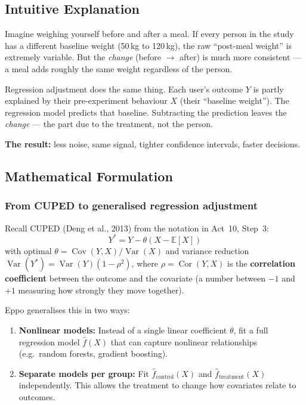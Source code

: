 \documentclass[12pt, a4paper]{article}
\newcommand{\E}{\mathbb{E}}            %
\newcommand{\Var}{\operatorname{Var}}
\newcommand{\Cov}{\operatorname{Cov}}
\newcommand{\Cor}{\operatorname{Cor}}
\begin{document}
\subsection{Intuitive Explanation}

\begin{intuition}
Imagine weighing yourself before and after a meal.  If every person in the
study has a different baseline weight (50\,kg to 120\,kg), the raw
``post-meal weight'' is extremely variable.  But the \emph{change} (before
$\to$ after) is much more consistent --- a meal adds roughly the same weight
regardless of the person.

Regression adjustment does the same thing.  Each user's outcome $Y$ is
partly explained by their pre-experiment behaviour $X$ (their ``baseline
weight'').  The regression model predicts that baseline.  Subtracting the
prediction leaves the \emph{change} --- the part due to the treatment, not
the person.

\textbf{The result:} less noise, same signal, tighter confidence intervals,
faster decisions.
\end{intuition}

\subsection{Mathematical Formulation}

\subsubsection*{From CUPED to generalised regression adjustment}

Recall CUPED (Deng et al., 2013) from the notation in Act~10, Step~3:
\[
  Y^* = Y - \theta(X - \E[X])
\]
with optimal $\theta = \Cov(Y,X)/\Var(X)$ and variance reduction
$\Var(Y^*) = \Var(Y)(1 - \rho^2)$, where $\rho = \Cor(Y,X)$ is the
\textbf{correlation coefficient} between the outcome and the covariate
(a number between $-1$ and $+1$ measuring how strongly they move together).

Eppo generalises this in two ways:
\begin{enumerate}[nosep]
  \item \textbf{Nonlinear models:}  Instead of a single linear coefficient
        $\theta$, fit a full regression model $\hat{f}(X)$ that can capture
        nonlinear relationships (e.g.\ random forests, gradient boosting).
  \item \textbf{Separate models per group:}  Fit $\hat{f}_{\text{control}}(X)$
        and $\hat{f}_{\text{treatment}}(X)$ independently.  This allows the
        treatment to change how covariates relate to outcomes.
\end{enumerate}
\end{document}
